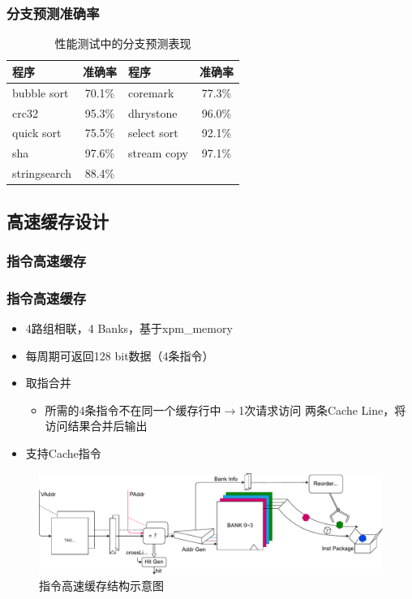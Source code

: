 \documentclass{beamer}
\begin{document}
\begin{frame}
    \frametitle{分支预测准确率}
    \begin{table}
        \centering
        \caption{性能测试中的分支预测表现}
        \begin{tabular}{lc|lc}
            \toprule
            程序 & 准确率 & 程序 & 准确率\\
            \midrule
            bubble sort & 70.1\% & coremark & 77.3\% \\
            crc32 & 95.3\% & dhrystone & 96.0\% \\
            quick sort & 75.5\% & select sort & 92.1\% \\
            sha & 97.6\% & stream copy & 97.1\% \\
            stringsearch & 88.4\% \\
            \bottomrule
        \end{tabular}
    \end{table}
\end{frame}

\subsection{高速缓存设计}

\subsubsection{指令高速缓存}

\begin{frame}
    \frametitle{指令高速缓存}

    \begin{itemize}
        \item 4路组相联，4 Banks，基于xpm\_memory
        \item 每周期可返回128 bit数据（4条指令）
        \item 取指合并\begin{itemize}
            \item 所需的4条指令不在同一个缓存行中$\rightarrow$1次请求访问
                  两条Cache Line，将访问结果合并后输出
        \end{itemize}
        \item 支持Cache指令
    \end{itemize}
    \begin{figure}
        \centering
        \includegraphics[width=\linewidth]{pic/icache.pdf}
        \caption{指令高速缓存结构示意图}
    \end{figure}
\end{frame}
\end{document}
